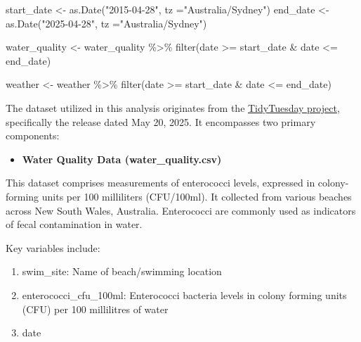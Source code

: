 \documentclass[
  11pt,
]{article}
\newenvironment{Shaded}{\begin{snugshade}}{\end{snugshade}}
\newcommand{\AttributeTok}[1]{\textcolor[rgb]{0.40,0.45,0.13}{#1}}
\newcommand{\FunctionTok}[1]{\textcolor[rgb]{0.28,0.35,0.67}{#1}}
\newcommand{\NormalTok}[1]{\textcolor[rgb]{0.00,0.23,0.31}{#1}}
\newcommand{\OtherTok}[1]{\textcolor[rgb]{0.00,0.23,0.31}{#1}}
\newcommand{\SpecialCharTok}[1]{\textcolor[rgb]{0.37,0.37,0.37}{#1}}
\newcommand{\StringTok}[1]{\textcolor[rgb]{0.13,0.47,0.30}{#1}}
\providecommand{\tightlist}{%
  \setlength{\itemsep}{0pt}\setlength{\parskip}{0pt}}\usepackage{longtable,booktabs,array}
\begin{document}
\begin{Shaded}
\begin{Highlighting}[]
\NormalTok{start\_date }\OtherTok{\textless{}{-}} \FunctionTok{as.Date}\NormalTok{(}\StringTok{"2015{-}04{-}28"}\NormalTok{, }\AttributeTok{tz =}\StringTok{"Australia/Sydney"}\NormalTok{)}
\NormalTok{end\_date }\OtherTok{\textless{}{-}} \FunctionTok{as.Date}\NormalTok{(}\StringTok{"2025{-}04{-}28"}\NormalTok{, }\AttributeTok{tz =}\StringTok{"Australia/Sydney"}\NormalTok{)}

\NormalTok{water\_quality }\OtherTok{\textless{}{-}}\NormalTok{ water\_quality }\SpecialCharTok{\%\textgreater{}\%}
  \FunctionTok{filter}\NormalTok{(date }\SpecialCharTok{\textgreater{}=}\NormalTok{ start\_date }\SpecialCharTok{\&}\NormalTok{ date }\SpecialCharTok{\textless{}=}\NormalTok{ end\_date)}

\NormalTok{weather }\OtherTok{\textless{}{-}}\NormalTok{ weather }\SpecialCharTok{\%\textgreater{}\%}
  \FunctionTok{filter}\NormalTok{(date }\SpecialCharTok{\textgreater{}=}\NormalTok{ start\_date }\SpecialCharTok{\&}\NormalTok{ date }\SpecialCharTok{\textless{}=}\NormalTok{ end\_date)}
\end{Highlighting}
\end{Shaded}

The dataset utilized in this analysis originates from the
\href{https://github.com/rfordatascience/tidytuesday/blob/main/data/2025/2025-05-20/readme.md}{TidyTuesday
project}, specifically the release dated May 20, 2025. It encompasses
two primary components:

\begin{itemize}
\tightlist
\item
  \textbf{Water Quality Data (water\_quality.csv)}
\end{itemize}

This dataset comprises measurements of enterococci levels, expressed in
colony-forming units per 100 milliliters (CFU/100ml). It collected from
various beaches across New South Wales, Australia. Enterococci are
commonly used as indicators of fecal contamination in water.

Key variables include:

\begin{enumerate}
\def\labelenumi{\alph{enumi}.}
\tightlist
\item
  swim\_site: Name of beach/swimming location
\item
  enterococci\_cfu\_100ml: Enterococci bacteria levels in colony forming
  units (CFU) per 100 millilitres of water
\item
  date
\end{enumerate}
\end{document}
